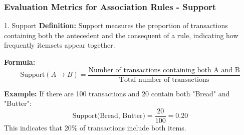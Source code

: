 \documentclass[aspectratio=169]{beamer}
\begin{document}
\begin{frame}[fragile]
    \frametitle{Evaluation Metrics for Association Rules - Support}
    
    \begin{block}{1. Support}
        \textbf{Definition:} Support measures the proportion of transactions containing both the antecedent and the consequent of a rule, indicating how frequently itemsets appear together.
        
        \textbf{Formula:}
        \begin{equation}
            \text{Support}(A \rightarrow B) = \frac{\text{Number of transactions containing both A and B}}{\text{Total number of transactions}}
        \end{equation}
        
        \textbf{Example:}
        If there are 100 transactions and 20 contain both "Bread" and "Butter":
        \begin{equation}
            \text{Support(Bread, Butter)} = \frac{20}{100} = 0.20
        \end{equation}
        This indicates that 20\% of transactions include both items.
    \end{block}
\end{frame}
\end{document}
